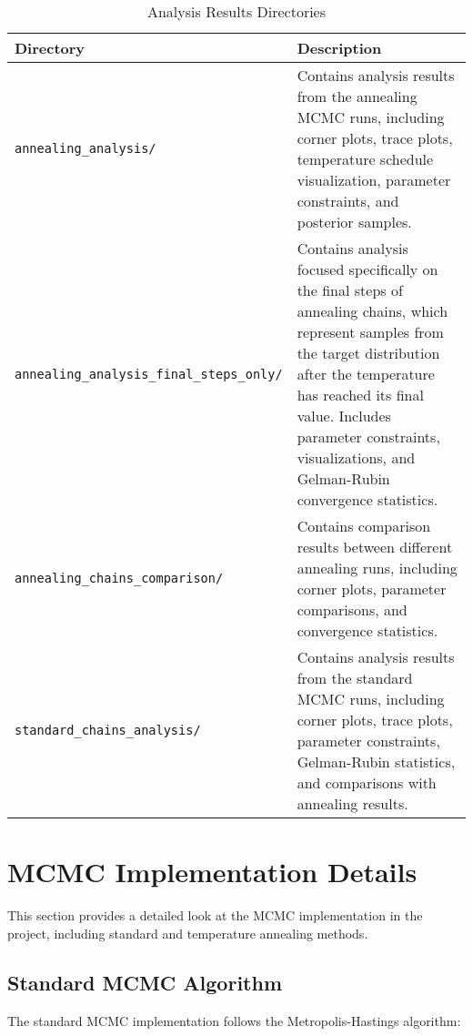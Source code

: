 \documentclass[11pt]{article}
\begin{document}
\begin{table}[H]
\centering
\begin{tabular}{p{5cm}p{10cm}}
\toprule
\textbf{Directory} & \textbf{Description} \\
\midrule
\texttt{annealing\_analysis/} & Contains analysis results from the annealing MCMC runs, including corner plots, trace plots, temperature schedule visualization, parameter constraints, and posterior samples. \\
\addlinespace
\texttt{annealing\_analysis\_final\_steps\_only/} & Contains analysis focused specifically on the final steps of annealing chains, which represent samples from the target distribution after the temperature has reached its final value. Includes parameter constraints, visualizations, and Gelman-Rubin convergence statistics. \\
\addlinespace
\texttt{annealing\_chains\_comparison/} & Contains comparison results between different annealing runs, including corner plots, parameter comparisons, and convergence statistics. \\
\addlinespace
\texttt{standard\_chains\_analysis/} & Contains analysis results from the standard MCMC runs, including corner plots, trace plots, parameter constraints, Gelman-Rubin statistics, and comparisons with annealing results. \\
\bottomrule
\end{tabular}
\caption{Analysis Results Directories}
\label{tab:analysis-dirs}
\end{table}

\newpage

\section{MCMC Implementation Details}

This section provides a detailed look at the MCMC implementation in the project, including standard and temperature annealing methods.

\subsection{Standard MCMC Algorithm}

The standard MCMC implementation follows the Metropolis-Hastings algorithm:
\end{document}
